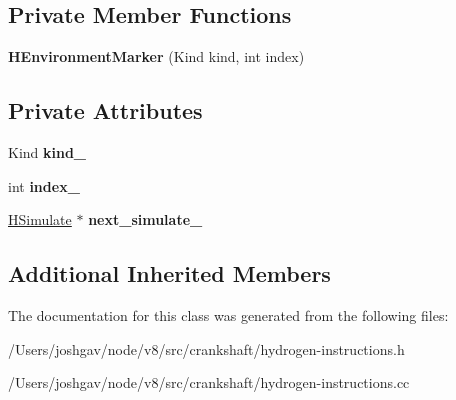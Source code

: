 \subsection*{Private Member Functions}
\begin{DoxyCompactItemize}
\item 
{\bfseries H\+Environment\+Marker} (Kind kind, int index)\hypertarget{classv8_1_1internal_1_1_h_environment_marker_aa88cbec6e5a2de0c76dd6a78a33ba1f7}{}\label{classv8_1_1internal_1_1_h_environment_marker_aa88cbec6e5a2de0c76dd6a78a33ba1f7}

\end{DoxyCompactItemize}
\subsection*{Private Attributes}
\begin{DoxyCompactItemize}
\item 
Kind {\bfseries kind\+\_\+}\hypertarget{classv8_1_1internal_1_1_h_environment_marker_a32cdffa2479050c807674c2e784d0aed}{}\label{classv8_1_1internal_1_1_h_environment_marker_a32cdffa2479050c807674c2e784d0aed}

\item 
int {\bfseries index\+\_\+}\hypertarget{classv8_1_1internal_1_1_h_environment_marker_a91caa8076389a447402f6447c0e7671d}{}\label{classv8_1_1internal_1_1_h_environment_marker_a91caa8076389a447402f6447c0e7671d}

\item 
\hyperlink{classv8_1_1internal_1_1_h_simulate}{H\+Simulate} $\ast$ {\bfseries next\+\_\+simulate\+\_\+}\hypertarget{classv8_1_1internal_1_1_h_environment_marker_afe6199423b34b5bf7c456354209fba6a}{}\label{classv8_1_1internal_1_1_h_environment_marker_afe6199423b34b5bf7c456354209fba6a}

\end{DoxyCompactItemize}
\subsection*{Additional Inherited Members}


The documentation for this class was generated from the following files\+:\begin{DoxyCompactItemize}
\item 
/\+Users/joshgav/node/v8/src/crankshaft/hydrogen-\/instructions.\+h\item 
/\+Users/joshgav/node/v8/src/crankshaft/hydrogen-\/instructions.\+cc\end{DoxyCompactItemize}
